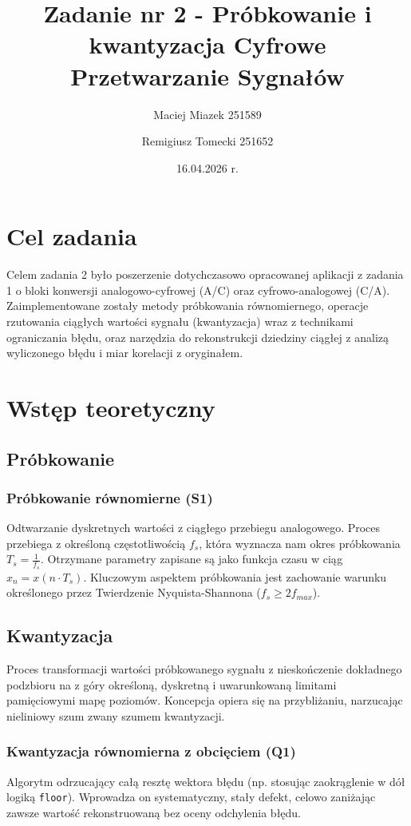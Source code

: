 \documentclass[12pt]{article}
\title{{\bf Zadanie nr 2 - Próbkowanie i kwantyzacja}\linebreak
Cyfrowe Przetwarzanie Sygnałów}
\author{Maciej Miazek 251589 \and Remigiusz Tomecki 251652}
\date{16.04.2026 r.} %
\begin{document}
\clearpage\maketitle
\thispagestyle{empty}
\newpage
\setcounter{page}{1}
\section{Cel zadania}
Celem zadania 2 było poszerzenie dotychczasowo opracowanej aplikacji z zadania 1 o bloki konwersji analogowo-cyfrowej (A/C) oraz cyfrowo-analogowej (C/A). Zaimplementowane zostały metody próbkowania równomiernego, operacje rzutowania ciągłych wartości sygnału (kwantyzacja) wraz z technikami ograniczania błędu, oraz narzędzia do rekonstrukcji dziedziny ciągłej z analizą wyliczonego błędu i miar korelacji z oryginałem.\\

\section{Wstęp teoretyczny}
\subsection{Próbkowanie}

\subsubsection*{Próbkowanie równomierne (S1)}
Odtwarzanie dyskretnych wartości z ciągłego przebiegu analogowego. Proces przebiega z określoną częstotliwością $f_s$, która wyznacza nam okres próbkowania $T_s = \frac{1}{f_s}$. Otrzymane parametry zapisane są jako funkcja czasu w ciąg $x_n = x(n \cdot T_s)$. Kluczowym aspektem próbkowania jest zachowanie warunku określonego przez Twierdzenie Nyquista-Shannona ($f_s \ge 2f_{max}$).

\subsection{Kwantyzacja}
Proces transformacji wartości próbkowanego sygnału z nieskończenie dokładnego podzbioru na z góry określoną, dyskretną i uwarunkowaną limitami pamięciowymi mapę poziomów. Koncepcja opiera się na przybliżaniu, narzucając nieliniowy szum zwany szumem kwantyzacji.

\subsubsection*{Kwantyzacja równomierna z obcięciem (Q1)}
Algorytm odrzucający całą resztę wektora błędu (np. stosując zaokrąglenie w dół logiką \texttt{floor}). Wprowadza on systematyczny, stały defekt, celowo zaniżając zawsze wartość rekonstruowaną bez oceny odchylenia błędu.
\end{document}
